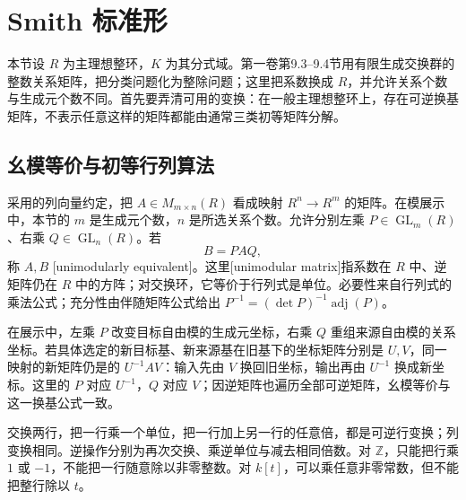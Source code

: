 
\section{Smith 标准形}
\label{b2:sec:0401}


本节设 \(R\) 为主理想整环，\(K\) 为其分式域。第一卷第9.3--9.4节用有限生成交换群的整数关系矩阵，把分类问题化为整除问题；这里把系数换成 \(R\)，并允许关系个数与生成元个数不同。首先要弄清可用的变换：在一般主理想整环上，存在可逆换基矩阵，不表示任意这样的矩阵都能由通常三类初等矩阵分解。

\subsection{幺模等价与初等行列算法}
\label{b2:subsec:0401:01}

采用的列向量约定，把 \(A\in M_{m\times n}(R)\) 看成映射 \(R^n\to R^m\) 的矩阵。在模展示中，本节的 \(m\) 是生成元个数，\(n\) 是所选关系个数。允许分别左乘 \(P\in\operatorname{GL}_m(R)\)、右乘 \(Q\in\operatorname{GL}_n(R)\)。若
\[
	B=PAQ,
\]
称 \(A,B\) [unimodularly equivalent]。这里[unimodular matrix]指系数在 \(R\) 中、逆矩阵仍在 \(R\) 中的方阵；对交换环，它等价于行列式是单位。必要性来自行列式的乘法公式；充分性由伴随矩阵公式给出 \(P^{-1}=(\det P)^{-1}\operatorname{adj}(P)\)。

\ProseParagraphBreak
在展示中，左乘 \(P\) 改变目标自由模的生成元坐标，右乘 \(Q\) 重组来源自由模的关系坐标。若具体选定的新目标基、新来源基在旧基下的坐标矩阵分别是 \(U,V\)，同一映射的新矩阵仍是的 \(U^{-1}AV\)：输入先由 \(V\) 换回旧坐标，输出再由 \(U^{-1}\) 换成新坐标。这里的 \(P\) 对应 \(U^{-1}\)，\(Q\) 对应 \(V\)；因逆矩阵也遍历全部可逆矩阵，幺模等价与这一换基公式一致。

\ProseParagraphBreak
交换两行，把一行乘一个单位，把一行加上另一行的任意倍，都是可逆行变换；列变换相同。逆操作分别为再次交换、乘逆单位与减去相同倍数。对 \(\mathbb Z\)，只能把行乘 \(1\) 或 \(-1\)，不能把一行随意除以非零整数。对 \(k[t]\)，可以乘任意非零常数，但不能把整行除以 \(t\)。

